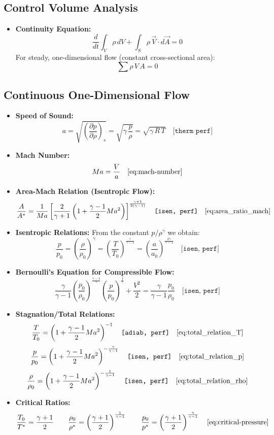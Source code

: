 \subsection*{Control Volume Analysis}
\begin{itemize}
    \item \textbf{Continuity Equation:}  
    $$
	    \frac{d}{dt} \int_V \rho\,dV + \int_S \rho\, \vec{V}\cdot d\vec{A} = 0
    $$
    For steady, one-dimensional flow (constant cross-sectional area):
    $$
		\sum \rho\,V\,A = 0
    $$
\end{itemize}

\subsection*{Continuous One-Dimensional Flow}
\begin{itemize}
    \item \textbf{Speed of Sound:}  
    $$
	    a = \sqrt{\left(\frac{\partial p}{\partial \rho}\right)_s} = \sqrt{\gamma\,\frac{p}{\rho}} = \sqrt{\gamma\,R\,T} \quad \texttt{[therm perf]}
    $$
    \item \textbf{Mach Number:}  
    $$
	    Ma = \frac{V}{a}\quad\eqref{eq:mach-number}
    $$
    \item \textbf{Area-Mach Relation (Isentropic Flow):}  
    $$
	    \frac{A}{A^*} = \frac{1}{Ma}\left[\frac{2}{\gamma+1}\left(1+\frac{\gamma-1}{2}Ma^2\right)\right]^{\frac{\gamma+1}{2(\gamma-1)}} \quad \texttt{[isen, perf]}\quad\eqref{eq:area_ratio_mach}
    $$
    \item \textbf{Isentropic Relations:}  
    From the constant $ p/\rho^\gamma $ we obtain:
    $$
	    \frac{p}{p_0} = \left(\frac{\rho}{\rho_0}\right)^\gamma = \left(\frac{T}{T_0}\right)^{\frac{\gamma}{\gamma-1}} = \left(\frac{a}{a_0}\right)^{\frac{2\gamma}{\gamma-1}} \quad \texttt{[isen, perf]}
    $$
    \item \textbf{Bernoulli’s Equation for Compressible Flow:}  
    $$
	    \frac{\gamma}{\gamma-1}\left(\frac{p_0}{\rho_0}\right)^{\frac{\gamma-1}{\gamma}}\left(\frac{p}{p_0}\right)^{\frac{1}{\gamma}} + \frac{V^2}{2} = \frac{\gamma}{\gamma-1}\frac{p_0}{\rho_0} \quad \texttt{[isen, perf]}
    $$
    \item \textbf{Stagnation/Total Relations:}  
    $$
	    \frac{T}{T_0} = \left(1+\frac{\gamma-1}{2}Ma^2\right)^{-1} \quad \texttt{[adiab, perf]} \quad \eqref{eq:total_relation_T}
    $$
    $$
	    \frac{p}{p_0} = \left(1+\frac{\gamma-1}{2}Ma^2\right)^{-\frac{\gamma}{\gamma-1}} \quad \texttt{[isen, perf]} \quad \eqref{eq:total_relation_p}
    $$
    $$
	    \frac{\rho}{\rho_0} = \left(1+\frac{\gamma-1}{2}Ma^2\right)^{-\frac{1}{\gamma-1}} \quad \texttt{[isen, perf]} \quad \eqref{eq:total_relation_rho}
    $$
    \item \textbf{Critical Ratios:}  
    $$
	    \frac{T_0}{T^*} = \frac{\gamma+1}{2}
			\qquad
	    \frac{\rho_0}{\rho^*} = \left(\frac{\gamma+1}{2}\right)^{\frac{1}{\gamma-1}}
			\qquad
	    \frac{p_0}{p^*} = \left(\frac{\gamma+1}{2}\right)^{\frac{\gamma}{\gamma-1}} \quad \eqref{eq:critical-pressure}
    $$
\end{itemize}

